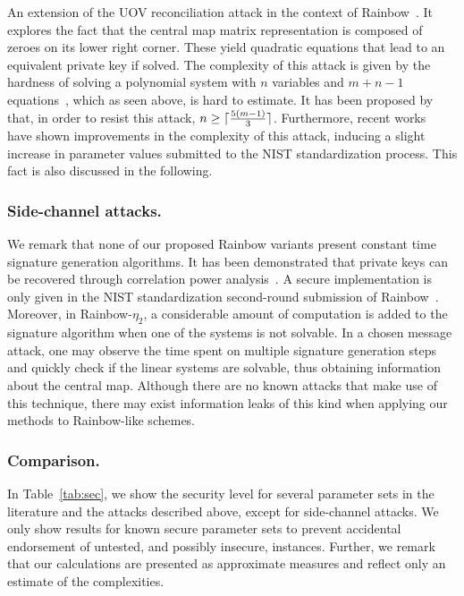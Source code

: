 \documentclass[english]{ufsc-thesis-rn46-2019/ufsc-thesis-rn46-2019}
\DeclarePairedDelimiter{\ceil}{\lceil}{\rceil}
\theoremstyle{definition}
\begin{document}
An extension of the UOV reconciliation attack in the context of
Rainbow~\cite{Ding:200806}. It explores the fact that the central map matrix
representation is composed of zeroes on its lower right corner. These yield
quadratic equations that lead to an equivalent private key if solved. The
complexity of this attack is given by the hardness of solving a polynomial
system with $n$ variables and $m + n - 1$
equations~\cite[Thm.~3.30]{Thomae:201306}, which as seen above, is hard to
estimate. It has been proposed by~\cite{Petzoldt:201005} that, in order to
resist this attack, $n \geq \ceil{\frac{5 (m - 1)}{3}}$. Furthermore, recent
works~\cite{Perlner:202006,Nakamura:202006} have shown improvements in the
complexity of this attack, inducing a slight increase in parameter values
submitted to the NIST standardization process. This fact is also discussed in
the following.

\subsubsection{Side-channel attacks.}

We remark that none of our proposed Rainbow variants present constant time
signature generation algorithms. It has been demonstrated that private keys can
be recovered through correlation power analysis~\cite{Park:201808}. A secure
implementation is only given in the NIST standardization second-round
submission of Rainbow~\cite{Ding:201901}. Moreover, in Rainbow-$\eta_2$,
a considerable amount of computation is added to the signature algorithm when
one of the systems is not solvable. In a chosen message attack, one may observe
the time spent on multiple signature generation steps and quickly check if the
linear systems are solvable, thus obtaining information about the central
map. Although there are no known attacks that make use of this technique, there
may exist information leaks of this kind when applying our methods to
Rainbow-like schemes.

\subsubsection{Comparison.}

In Table~\ref{tab:sec}, we show the security level for several parameter sets
in the literature and the attacks described above, except for side-channel
attacks. We only show results for known secure parameter sets to prevent
accidental endorsement of untested, and possibly insecure, instances. Further,
we remark that our calculations are presented as approximate measures and
reflect only an estimate of the complexities.
\end{document}
